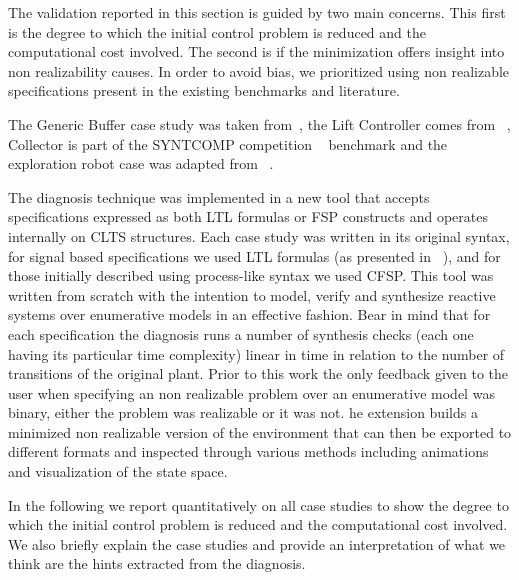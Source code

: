 The validation reported in this section is guided by two main concerns.  This first is the degree to which the initial control problem is reduced and the computational cost involved. The second is if the minimization offers insight into non realizability causes.
In order to avoid bias, we prioritized using non realizable specifications present in the existing benchmarks and literature.

The Generic Buffer case study was taken from~\cite{DBLP:conf/hvc/KonighoferHB10}, the Lift Controller comes from ~\cite{DBLP:conf/fmcad/AlurMT13}, Collector is part of the SYNTCOMP competition ~\cite{SYNTCOMP} benchmark and the exploration robot case was adapted from ~\cite{DBLP:journals/corr/abs-2001-07678}.

The diagnosis technique was implemented in a new tool that accepts specifications expressed as both LTL formulas or FSP constructs and operates internally on CLTS structures. Each case study was written in its original syntax, for signal based specifications we used LTL formulas (as presented in ~\cite{Bloem:2012}), and for those initially described using process-like syntax we used CFSP. This tool was written from scratch with the intention to model, verify and synthesize reactive systems over enumerative models in an effective fashion. Bear in mind that for each specification the diagnosis runs a number of synthesis checks (each one having its particular time complexity) linear in time in relation to the number of transitions of the original plant.
Prior to this work the only feedback given to the user  when specifying an non realizable problem over an enumerative model was binary, either the problem was realizable or it was not.
he extension builds a minimized non realizable version of the environment that can then be exported to different formats and inspected through various methods including animations and visualization of the state space.

In the following we report quantitatively on all case studies to show the degree to which the initial control problem is reduced and the computational cost involved. We also briefly explain the case studies and provide an interpretation of what we think are the hints extracted from the diagnosis. 

